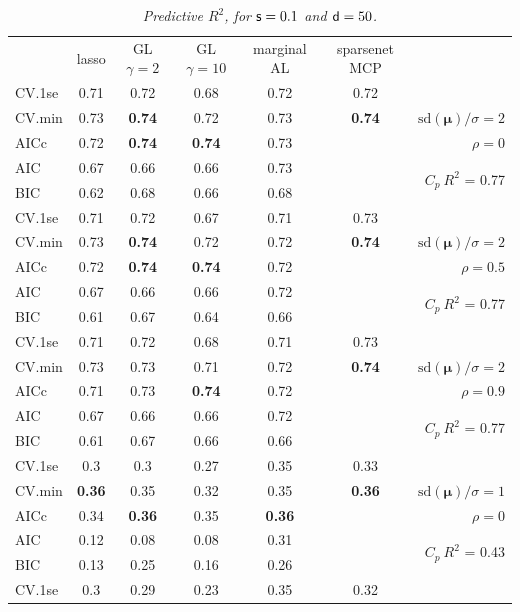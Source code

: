 \documentclass[12pt]{article}
\newcommand{\mr}[1]{\mathrm{#1}}
\newcommand{\bm}[1]{\mathbf{#1}}
\begin{document}
\begin{table}[p]\vspace{-.5cm}
\caption[l]{\it Predictive $R^2$, for ${\sf s}=0.1$ and  ${\sf d}=50$.}
\vspace{-.5cm}
\small{}
\begin{center}
\begin{tabular}{l*{5}{c}|r}
 & lasso & GL $\gamma=2$ & GL $\gamma=10$ & marginal AL & sparsenet MCP  &  \\
\cline{1-7}
CV.1se & 0.71 & 0.72 & 0.68 & 0.72 & 0.72 &\\
CV.min & 0.73 & {\bf 0.74} & 0.72 & 0.73 & {\bf 0.74} &  $\mr{sd}(\bm{\mu})/\sigma=2$ \\
AICc & 0.72 & {\bf 0.74} & {\bf 0.74} & 0.73 & & $\rho=0$ \\
AIC & 0.67 & 0.66 & 0.66 & 0.73 & & \multirow{2}{*}{$C_p ~ R^2$ = 0.77} \\
BIC & 0.62 & 0.68 & 0.66 & 0.68 & & \\
 \hline 
CV.1se & 0.71 & 0.72 & 0.67 & 0.71 & 0.73 &\\
CV.min & 0.73 & {\bf 0.74} & 0.72 & 0.72 & {\bf 0.74} &  $\mr{sd}(\bm{\mu})/\sigma=2$ \\
AICc & 0.72 & {\bf 0.74} & {\bf 0.74} & 0.72 & & $\rho=0.5$ \\
AIC & 0.67 & 0.66 & 0.66 & 0.72 & & \multirow{2}{*}{$C_p ~ R^2$ = 0.77} \\
BIC & 0.61 & 0.67 & 0.64 & 0.66 & & \\
 \hline 
CV.1se & 0.71 & 0.72 & 0.68 & 0.71 & 0.73 &\\
CV.min & 0.73 & 0.73 & 0.71 & 0.72 & {\bf 0.74} &  $\mr{sd}(\bm{\mu})/\sigma=2$ \\
AICc & 0.71 & 0.73 & {\bf 0.74} & 0.72 & & $\rho=0.9$ \\
AIC & 0.67 & 0.66 & 0.66 & 0.72 & & \multirow{2}{*}{$C_p ~ R^2$ = 0.77} \\
BIC & 0.61 & 0.67 & 0.66 & 0.66 & & \\
 \hline 
CV.1se & 0.3 & 0.3 & 0.27 & 0.35 & 0.33 &\\
CV.min & {\bf 0.36} & 0.35 & 0.32 & 0.35 & {\bf 0.36} &  $\mr{sd}(\bm{\mu})/\sigma=1$ \\
AICc & 0.34 & {\bf 0.36} & 0.35 & {\bf 0.36} & & $\rho=0$ \\
AIC & 0.12 & 0.08 & 0.08 & 0.31 & & \multirow{2}{*}{$C_p ~ R^2$ = 0.43} \\
BIC & 0.13 & 0.25 & 0.16 & 0.26 & & \\
 \hline 
CV.1se & 0.3 & 0.29 & 0.23 & 0.35 & 0.32 &\\

\end{tabular}
\end{center}
\end{table}
\end{document}
